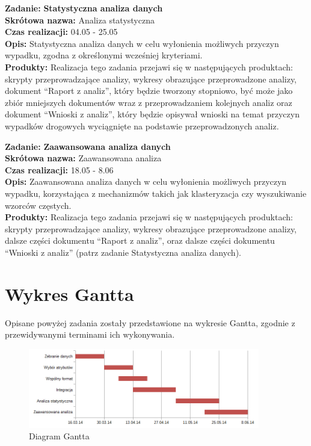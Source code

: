 \textbf{Zadanie:} \textbf{Statystyczna analiza danych}\\\textbf{Skrótowa
nazwa:} Analiza statystyczna\\\textbf{Czas realizacji:} 04.05 -
25.05\\\textbf{Opis:} Statystyczna analiza danych w celu wyłonienia
możliwych przyczyn wypadku, zgodna z określonymi wcześniej
kryteriami.\\\textbf{Produkty:} Realizacja tego zadania przejawi się w
następujących produktach: skrypty przeprowadzające analizy, wykresy
obrazujące przeprowadzone analizy, dokument ``Raport z analiz'', który
będzie tworzony stopniowo, być może jako zbiór mniejszych dokumentów
wraz z przeprowadzaniem kolejnych analiz oraz dokument ``Wnioski z
analiz'', który będzie opisywał wnioski na temat przyczyn wypadków
drogowych wyciągnięte na podstawie przeprowadzonych analiz.

\textbf{Zadanie:} \textbf{Zaawansowana analiza danych}\\\textbf{Skrótowa
nazwa:} Zaawansowana analiza\\\textbf{Czas realizacji:} 18.05 -
8.06\\\textbf{Opis:} Zaawansowana analiza danych w celu wyłonienia
możliwych przyczyn wypadku, korzystająca z mechanizmów takich jak
klasteryzacja czy wyszukiwanie wzorców częstych.\\\textbf{Produkty:}
Realizacja tego zadania przejawi się w następujących produktach: skrypty
przeprowadzające analizy, wykresy obrazujące przeprowadzone analizy,
dalsze części dokumentu ``Raport z analiz'', oraz dalsze części
dokumentu ``Wnioski z analiz'' (patrz zadanie Statystyczna analiza
danych).

\section{Wykres Gantta}\label{wykres-gantta}

Opisane powyżej zadania zostały przedstawione na wykresie Gantta,
zgodnie z przewidywanymi terminami ich wykonywania.

\begin{figure}[htbp]
\centering
\includegraphics[width=0.9\textwidth]{images/gantt.png}
\caption{Diagram Gantta}
\end{figure}

